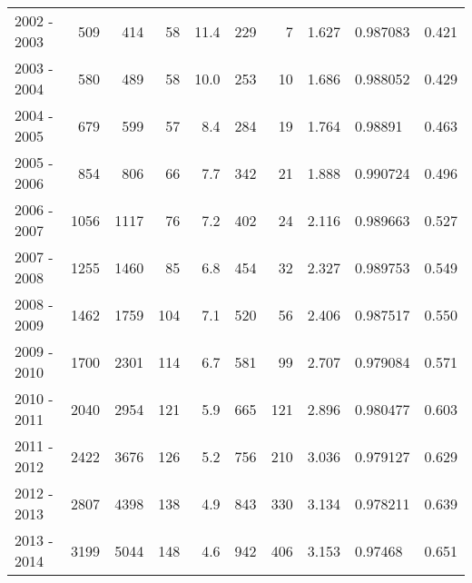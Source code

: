 \begin{tabular}{lrrrrrrrlr}
2002 - 2003 &      509 &      414 &                58 &              11.4 &                     229 &                          7 &       1.627 &   0.987083 &             0.421 \\
2003 - 2004 &      580 &      489 &                58 &              10.0 &                     253 &                         10 &       1.686 &   0.988052 &             0.429 \\
2004 - 2005 &      679 &      599 &                57 &               8.4 &                     284 &                         19 &       1.764 &    0.98891 &             0.463 \\
2005 - 2006 &      854 &      806 &                66 &               7.7 &                     342 &                         21 &       1.888 &   0.990724 &             0.496 \\
2006 - 2007 &     1056 &     1117 &                76 &               7.2 &                     402 &                         24 &       2.116 &   0.989663 &             0.527 \\
2007 - 2008 &     1255 &     1460 &                85 &               6.8 &                     454 &                         32 &       2.327 &   0.989753 &             0.549 \\
2008 - 2009 &     1462 &     1759 &               104 &               7.1 &                     520 &                         56 &       2.406 &   0.987517 &             0.550 \\
2009 - 2010 &     1700 &     2301 &               114 &               6.7 &                     581 &                         99 &       2.707 &   0.979084 &             0.571 \\
2010 - 2011 &     2040 &     2954 &               121 &               5.9 &                     665 &                        121 &       2.896 &   0.980477 &             0.603 \\
2011 - 2012 &     2422 &     3676 &               126 &               5.2 &                     756 &                        210 &       3.036 &   0.979127 &             0.629 \\
2012 - 2013 &     2807 &     4398 &               138 &               4.9 &                     843 &                        330 &       3.134 &   0.978211 &             0.639 \\
2013 - 2014 &     3199 &     5044 &               148 &               4.6 &                     942 &                        406 &       3.153 &    0.97468 &             0.651 \\

\end{tabular}
